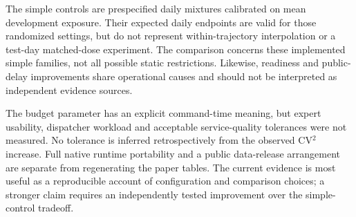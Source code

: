 The simple controls are prespecified daily mixtures calibrated on mean development exposure. Their expected daily endpoints are valid for those randomized settings, but do not represent within-trajectory interpolation or a test-day matched-dose experiment. The comparison concerns these implemented simple families, not all possible static restrictions. Likewise, readiness and public-delay improvements share operational causes and should not be interpreted as independent evidence sources.

The budget parameter has an explicit command-time meaning, but expert usability, dispatcher workload and acceptable service-quality tolerances were not measured. No tolerance is inferred retrospectively from the observed CV$^2$ increase. Full native runtime portability and a public data-release arrangement are separate from regenerating the paper tables. The current evidence is most useful as a reproducible account of configuration and comparison choices; a stronger claim requires an independently tested improvement over the simple-control tradeoff.

